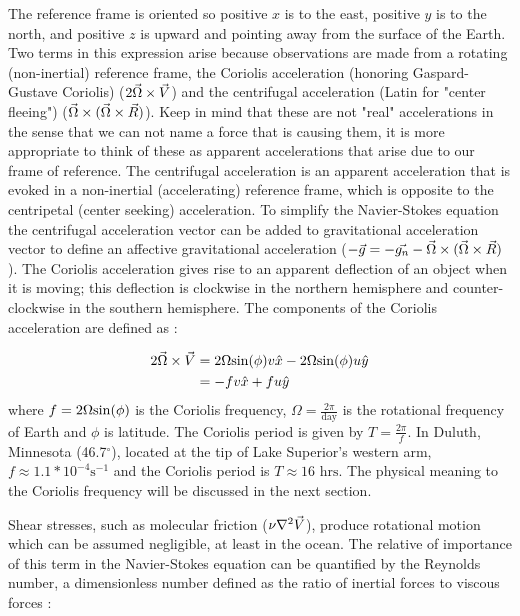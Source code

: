 The reference frame is oriented so positive $x$ is to the east, positive $y$ is to the north, and positive $z$ is upward and pointing away from the surface of the Earth.
Two terms in this expression arise because observations are made from a  rotating (non-inertial) reference frame, the Coriolis acceleration (honoring Gaspard-Gustave Coriolis) 
($2\vec{\Omega} \times \vec{V}$) and the  centrifugal acceleration (Latin for "center fleeing")  ($ \vec{\Omega} \times (\vec{\Omega} \times \vec{R})$). 
Keep in mind that these are not "real"  accelerations in the sense that we can not name a force that is causing them, it is more appropriate to think of these as apparent accelerations that 
arise due to our frame of reference. 
The centrifugal acceleration is an apparent acceleration that is evoked in a non-inertial (accelerating) reference frame, which is opposite to the
 centripetal (center seeking) acceleration. To simplify the Navier-Stokes equation the centrifugal acceleration vector can be added to gravitational 
 acceleration vector to define an affective gravitational acceleration ($-\vec{g}=-\vec{g_n} -\vec{\Omega} \times (\vec{\Omega} \times \vec{R})$). The Coriolis acceleration gives rise to an apparent 
 deflection of an object when it is moving; this deflection is clockwise in the northern hemisphere and counter-clockwise in the southern hemisphere. 
The components of the Coriolis acceleration are defined as : 
 
 \begin{align}
 	2\vec{\Omega} \times \vec{V} &= 2\Omega {\mathrm{sin}}(\phi) v \hat{x} - 2\Omega {\mathrm{sin}}(\phi) u \hat{y}\\
	&= -fv\hat{x} + fu \hat{y}
 \end{align}
where $f=2\Omega {\mathrm{sin}}(\phi)$ is the Coriolis frequency, $\Omega=\frac{2\pi}{\text{day}}$ is the rotational frequency of Earth and $\phi$ is latitude. The Coriolis period
is given by $T=\frac{2 \pi}{f}$. In Duluth, Minnesota (46.7$^{\circ}$), located at the tip of Lake Superior's western arm, $f \approx 1.1 *10^{-4} \text{s$^{-1}$}$ and the Coriolis period 
is $T \approx 16 \text{\ hrs}$. The physical meaning to the Coriolis frequency will be discussed in the next section.

Shear stresses, such as molecular friction ($\nu \nabla^2 \vec{V}$), produce rotational motion which can be assumed negligible, at least in the ocean. The relative of importance of this term in the Navier-Stokes equation can be quantified by the Reynolds number, a dimensionless number defined as the ratio of inertial forces to viscous forces : 
 

